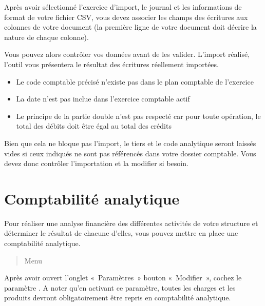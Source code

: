 \documentclass[a4paper,10pt,oneside,french]{sphinxmanual}
\begin{document}
Après avoir sélectionné l’exercice d’import, le journal et les informations de format de votre fichier CSV, vous devez associer les champs des écritures aux colonnes de votre document (la première ligne de votre document doit décrire la nature de chaque colonne).
\begin{quote}

\noindent{}
\end{quote}

Vous pouvez alors contrôler vos données avant de les valider.
L’import réalisé, l’outil vous présentera le résultat des écritures réellement importées.

\begin{itemize}
\item {} 
Le code comptable précisé n’existe pas dans le plan comptable de l’exercice

\item {} 
La date n’est pas inclue dans l’exercice comptable actif

\item {} 
Le principe de la partie double n’est pas respecté car pour toute opération, le total des débits doit être égal au total des crédits

\end{itemize}

Bien que cela ne bloque pas l’import, le tiers et le code analytique seront laissés vides si ceux indiqués ne sont pas référencés dans votre dossier comptable. Vous devez donc contrôler l’importation et la modifier si besoin.


\section{Comptabilité analytique}
\label{\detokenize{accounting/costaccounting:comptabilite-analytique}}\label{\detokenize{accounting/costaccounting::doc}}
Pour réaliser une analyse financière des différentes activités de votre structure et déterminer le résultat de chacune d’elles, vous pouvez mettre en place une comptabilité analytique.
\begin{quote}

Menu 
\end{quote}

Après avoir ouvert l’onglet « Paramètres » \sphinxhyphen{} bouton « Modifier », cochez le paramètre . A noter qu’en activant ce paramètre, toutes les charges et les produits devront obligatoirement être repris en comptabilité analytique.
\end{document}
